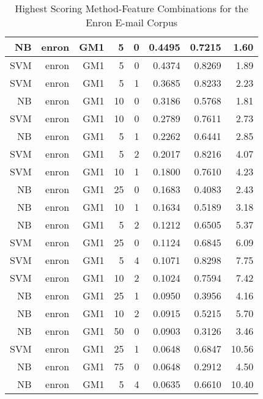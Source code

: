 \begin{table}[htbp!]
\begin{center}
\begin{tabular}{ | r | r | r | r | r | r | r | r | }
			NB & enron & GM1 & 5 & 0 & 0.4495 & 0.7215 & 1.60\\ \hline 
			SVM & enron & GM1 & 5 & 0 & 0.4374 & 0.8269 & 1.89\\ \hline 
			SVM & enron & GM1 & 5 & 1 & 0.3685 & 0.8233 & 2.23\\ \hline 
			NB & enron & GM1 & 10 & 0 & 0.3186 & 0.5768 & 1.81\\ \hline 
			SVM & enron & GM1 & 10 & 0 & 0.2789 & 0.7611 & 2.73\\ \hline 
			NB & enron & GM1 & 5 & 1 & 0.2262 & 0.6441 & 2.85\\ \hline 
			SVM & enron & GM1 & 5 & 2 & 0.2017 & 0.8216 & 4.07\\ \hline 
			SVM & enron & GM1 & 10 & 1 & 0.1800 & 0.7610 & 4.23\\ \hline 
			NB & enron & GM1 & 25 & 0 & 0.1683 & 0.4083 & 2.43\\ \hline 
			NB & enron & GM1 & 10 & 1 & 0.1634 & 0.5189 & 3.18\\ \hline 
			NB & enron & GM1 & 5 & 2 & 0.1212 & 0.6505 & 5.37\\ \hline 
			SVM & enron & GM1 & 25 & 0 & 0.1124 & 0.6845 & 6.09\\ \hline 
			SVM & enron & GM1 & 5 & 4 & 0.1071 & 0.8298 & 7.75\\ \hline 
			SVM & enron & GM1 & 10 & 2 & 0.1024 & 0.7594 & 7.42\\ \hline 
			NB & enron & GM1 & 25 & 1 & 0.0950 & 0.3956 & 4.16\\ \hline 
			NB & enron & GM1 & 10 & 2 & 0.0915 & 0.5215 & 5.70\\ \hline 
			NB & enron & GM1 & 50 & 0 & 0.0903 & 0.3126 & 3.46\\ \hline 
			SVM & enron & GM1 & 25 & 1 & 0.0648 & 0.6847 & 10.56\\ \hline 
			NB & enron & GM1 & 75 & 0 & 0.0648 & 0.2912 & 4.50\\ \hline 
			NB & enron & GM1 & 5 & 4 & 0.0635 & 0.6610 & 10.40\\ \hline 

		\end{tabular}
		\caption{Highest Scoring Method-Feature Combinations for the Enron E-mail Corpus}
		\label{tab:top_enron_by_score}
	\end{center}
\end{table}

